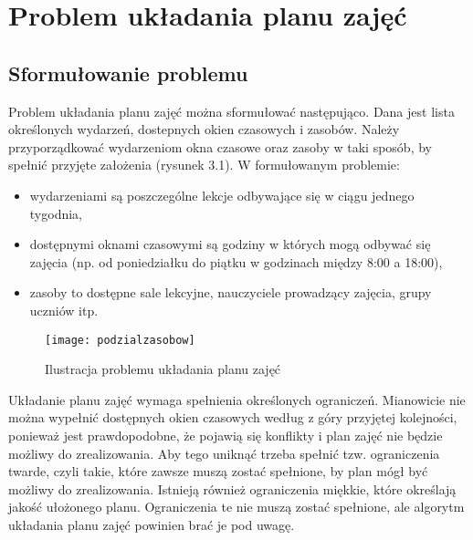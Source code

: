 \chapter{Problem układania planu zajęć}
\section{Sformułowanie problemu}
Problem układania planu zajęć można sformułować następująco. Dana jest lista określonych wydarzeń, dostepnych okien czasowych i zasobów. Należy przyporządkować wydarzeniom okna czasowe oraz zasoby w taki sposób, by spełnić przyjęte założenia (rysunek 3.1). W formułowanym problemie:
\begin{itemize}
	\item wydarzeniami są poszczególne lekcje odbywające się w ciągu jednego tygodnia,
	\item dostępnymi oknami czasowymi są godziny w których mogą odbywać się zajęcia (np. od poniedziałku do piątku w godzinach między 8:00 a 18:00),
	\item zasoby to dostępne sale lekcyjne, nauczyciele prowadzący zajęcia, grupy uczniów itp.
\end{itemize}


\begin{figure}
	\centering
	\texttt{[image: podzialzasobow]}
	\caption{Ilustracja problemu układania planu zajęć}
	\label{fig: podzialzasobow}
\end{figure}

Układanie planu zajęć wymaga spełnienia określonych ograniczeń. Mianowicie nie można wypełnić dostępnych okien czasowych według z góry przyjętej kolejności, ponieważ jest prawdopodobne, że pojawią się konflikty i plan zajęć nie będzie możliwy do zrealizowania. Aby tego uniknąć trzeba spełnić tzw. ograniczenia twarde, czyli takie, które zawsze muszą zostać spełnione, by plan mógł być możliwy do zrealizowania. Istnieją również ograniczenia miękkie, które określają jakość ułożonego planu. Ograniczenia te nie muszą zostać spełnione, ale algorytm układania planu zajęć powinien brać je pod uwagę.

